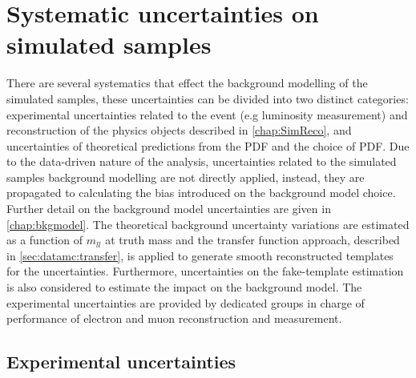 \chapter{Systematic uncertainties on simulated samples}\label{chap:sysmc}

There are several systematics that effect the background modelling of the simulated samples, these uncertainties can be divided into two distinct categories: experimental uncertainties related to the event (e.g luminosity measurement) and reconstruction of the physics objects described in \cref{chap:SimReco}, and uncertainties of theoretical predictions from the PDF and the choice of PDF. Due to the data-driven nature of the analysis, uncertainties related to the simulated samples background modelling are not directly applied, instead, they are propagated to calculating the bias introduced on the background model choice. Further detail on the background model uncertainties are given in \cref{chap:bkgmodel}. The theoretical background uncertainty variations are estimated as a function of $m_{ll}$ at truth mass and the transfer function approach, described in \cref{sec:datamc:transfer}, is applied to generate smooth reconstructed templates for the uncertainties. Furthermore, uncertainties on the fake-template estimation is also considered to estimate the impact on the background model. The experimental uncertainties are provided by dedicated groups in charge of performance of electron and muon reconstruction and measurement.

\section{Experimental uncertainties}

